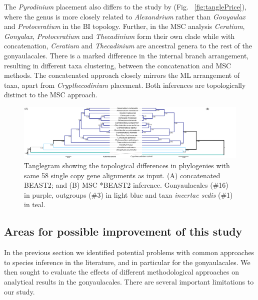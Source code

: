 \documentclass[fleqn,10pt,lineno]{wlpeerj} %
\begin{document}
The \textit{Pyrodinium} placement also differs to the study by \cite{price2017robust} (Fig. ~\ref{fig:tanglePrice}), where the genus is more closely related to \textit{Alexandrium} rather than \textit{Gonyaulax} and \textit{Protoceratium} in the BI topology. 
Further, in the MSC analysis \textit{Ceratium}, \textit{Gonyalax}, \textit{Protoceratium} and \textit{Thecadinium} form their own clade while with concatenation, \textit{Ceratium} and \textit{Thecadinium} are ancestral genera to the rest of the gonyaulacales. 
There is a marked difference in the internal branch arrangement, resulting in different taxa clustering, between the concatenation and MSC methods.
The concatenated approach closely mirrors the ML arrangement of taxa, apart from \textit{Crypthecodinium} placement. 
Both inferences are topologically distinct to the MSC approach.

\begin{figure}[ht]
\centering
\includegraphics[width=\linewidth]{gonya-figs/SC-MSC-BI_vs_SC-concat-BI.png} 
\caption{Tanglegram showing the topological differences in phylogenies with same 58 single copy gene alignments as input. (A) concatenated BEAST2; and (B) MSC *BEAST2 inference. Gonyaulacales (\#16) in purple, outgroups (\#3) in light blue and taxa \textit{incertae sedis} (\#1) in teal.} 
\label{fig:tangleconcatBI}
\end{figure} 


\subsection*{Areas for possible improvement of this study}
In the previous section we identified potential problems with common approaches to species inference in the literature, and in particular for the gonyaulacales. 
We then sought to evaluate the effects of different methodological approaches on analytical results in the gonyaulacales. 
There are several important limitations to our study. 
\end{document}

